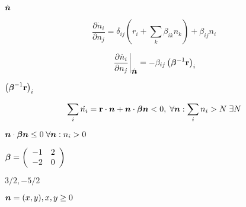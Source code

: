 {\newpage\clearpage
{}%
$\dot{\mbox{\boldmath {$n$}}}$%
\lthtmlinlinemathZ
\lthtmlcheckvsize\clearpage}

{\newpage\clearpage
{}%
\begin{displaymath}
\frac{\partial\dot{n}_i}{\partial n_j} =
\delta_{ij}\left(r_i+\sum_k\beta_{ik}n_k\right) + \beta_{ij}n_i
\end{displaymath}%
\lthtmldisplayZ
\lthtmlcheckvsize\clearpage}

{\newpage\clearpage
{}%
\begin{displaymath}
\left.\frac{\partial\dot{n}_i}{\partial n_j}\right|_{\hat{\mbox{\boldmath {$n$}}}}=
-\beta_{ij}\left(\mbox{\boldmath {$\beta$}}^{-1}\mbox{${\bf r}$}\right)_i
\end{displaymath}%
\lthtmldisplayZ
\lthtmlcheckvsize\clearpage}

{\newpage\clearpage
{}%
$\left(\mbox{\boldmath {$\beta$}}^{-1}\mbox{${\bf r}$}\right)_i$%
\lthtmlinlinemathZ
\lthtmlcheckvsize\clearpage}

{\newpage\clearpage
{}%
\begin{displaymath}
\sum_i\dot{n_i}=\mbox{${\bf r}$}\cdot\mbox{\boldmath {$n$}}+ \mbox{\boldmath {$n$}}\cdot\mbox{\boldmath {$\beta$}}\mbox{\boldmath {$n$}}< 0, \;\forall \mbox{\boldmath {$n$}}:
\sum_in_i>N \;\exists N
\end{displaymath}%
\lthtmldisplayZ
\lthtmlcheckvsize\clearpage}

{\newpage\clearpage
{}%
$\mbox{\boldmath {$n$}}\cdot\mbox{\boldmath {$\beta$}}\mbox{\boldmath {$n$}}\leq0
\; \forall\mbox{\boldmath {$n$}}: n_i>0$%
\lthtmlinlinemathZ
\lthtmlcheckvsize\clearpage}

{\newpage\clearpage
{}%
$\mbox{\boldmath {$\beta$}}=\left(\begin{array}{cc}
-1 & 2\\
-2 & 0\\
\end{array}\right)$%
\lthtmlinlinemathZ
\lthtmlcheckvsize\clearpage}

{\newpage\clearpage
{}%
$3/2, -5/2$%
\lthtmlinlinemathZ
\lthtmlcheckvsize\clearpage}

{\newpage\clearpage
{}%
$\mbox{\boldmath {$n$}}=(x,y), x,y\geq0$%
\lthtmlinlinemathZ
\lthtmlcheckvsize\clearpage}

